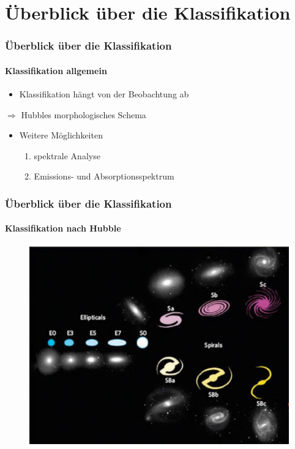 








\begin{frame}
\titlepage
\end{frame}



\begin{frame}
\tableofcontents
\end{frame}


\section{Überblick über die Klassifikation}

\begin{frame}
\frametitle{Überblick über die Klassifikation}
\framesubtitle{Klassifikation allgemein}

\begin{itemize}
\item Klassifikation hängt von der Beobachtung ab
\end{itemize}
\qquad $\Rightarrow$ Hubbles morphologisches Schema



\begin{itemize}
\item Weitere Möglichkeiten
\begin{enumerate}
\item spektrale Analyse
\item Emissions- und Absorptionsspektrum
\end{enumerate}
\end{itemize}

\end{frame}


\begin{frame}
\frametitle{Überblick über die Klassifikation}
\framesubtitle{Klassifikation nach Hubble}
\begin{figure}
\includegraphics[scale=0.5]{Hubble_Entwicklung.jpg}
\end{figure}
\end{frame}





